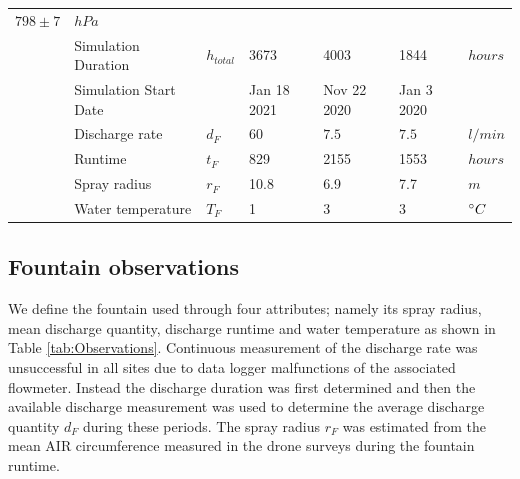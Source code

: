 \documentclass[utf8]{frontiersSCNS}
\begin{document}
\begin{table}
\begin{tabular}{@{}|lllllll|@{}}
		$798 \pm7$             & $hPa$                                                                                                     \\
		\multicolumn{1}{|l|}{} & Simulation Duration         & $h_{total} $    & 3673          & 4003
		                       & 1844                        & $hours$                                                                     \\
		\multicolumn{1}{|l|}{} & Simulation Start Date         &     & Jan 18 2021   & Nov 22 2020
		                       & Jan 3 2020                       &                                                                      \\\bottomrule
		\multicolumn{1}{|l|}{\multirow{4}{*}{\rotatebox[origin=c]{90}{Fountain}}}
		                       & Discharge rate             & $d_F     $      & $60$          & $7.5$        &
		$7.5$                  & $l/min$                                                                                                   \\
		\multicolumn{1}{|l|}{} & Runtime                     & $t_F $          & 829           & 2155
		                       & 1553                        & $hours$                                                                     \\
		\multicolumn{1}{|l|}{} & Spray radius                & $r_{F}$         & 10.8          & 6.9
		                       & 7.7                         & $m$                                                                         \\
		\multicolumn{1}{|l|}{} & Water temperature           & $T_{F}$         & 1             & 3
		                       & 3                           & $\degree C$                                                                 \\\midrule
	\end{tabular}
\end{table}


\subsection{Fountain observations}

We define the fountain used through four attributes; namely its spray radius, mean discharge quantity, discharge
runtime and water temperature as shown in Table \ref{tab:Observations}. Continuous measurement of the discharge
rate was unsuccessful in all sites due to data logger malfunctions of the associated flowmeter. Instead the
discharge duration was first determined and then the available discharge measurement was used to determine the
average discharge quantity $d_F$ during these periods.  The spray radius $r_F$ was estimated from the mean AIR
circumference measured in the drone surveys during the fountain runtime.
\end{document}
